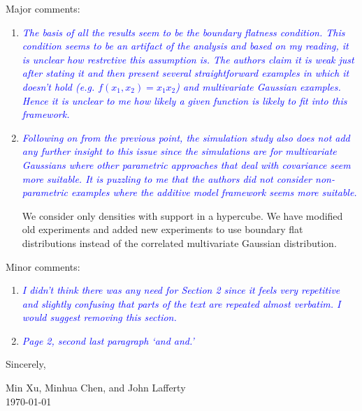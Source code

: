 \documentclass[pdftex,12pt]{article}
\def\rc#1{{\it\textcolor{blue}{#1}}\smallskip}
\begin{document}
Major comments:

\begin{enumerate}
\item \rc{The basis of all the results seem to be the boundary flatness
condition. This condition seems to be an artifact of the analysis and
based on my reading, it is unclear how restrctive this assumption
is. The authors claim it is weak just after stating it and then
present several straightforward examples in which it doesn't hold
(e.g. $f(x_1,x_2)=x_1 x_2$) and multivariate Gaussian examples. Hence it is unclear to me how
likely a given function is likely to fit into this framework.}

\item \rc{Following on from the previous point, the simulation study also does
not add any further insight to this issue since the simulations are
for multivariate Gaussians where other parametric approaches that deal
with covariance seem more suitable. It is puzzling to me that the
authors did not consider non-parametric examples where the additive
model framework seems more suitable.}

We consider only densities with support in a hypercube. We have modified old experiments and added new experiments to use boundary flat distributions instead of the correlated multivariate Gaussian distribution. 


\end{enumerate}

Minor comments:

\begin{enumerate}
\item \rc{I didn't think there was any need for Section 2
  since it feels very repetitive and slightly confusing that parts of
  the text are repeated almost verbatim. I would suggest removing this section.}

\item \rc{Page 2, second last paragraph `and and.'}
\end{enumerate}


\vspace*{10pt}

Sincerely, 


Min Xu, Minhua Chen, and John Lafferty\\[1pt]
\today{}


\end{document}
